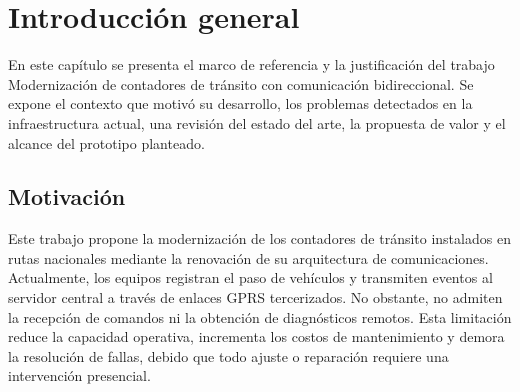 
\chapter{Introducción general} %

\label{Chapter1} %
\label{IntroGeneral}


\newcommand{\keyword}[1]{\textbf{#1}}
\newcommand{\tabhead}[1]{\textbf{#1}}
\newcommand{\code}[1]{\texttt{#1}}
\newcommand{\file}[1]{\texttt{\bfseries#1}}
\newcommand{\option}[1]{\texttt{\itshape#1}}
\newcommand{\grados}{$^{\circ}$}

En este capítulo se presenta el marco de referencia y la justificación del trabajo Modernización de contadores de tránsito con comunicación bidireccional. Se expone el contexto que motivó su desarrollo, los problemas detectados en la infraestructura actual, una revisión del estado del arte, la propuesta de valor y el alcance del prototipo planteado.





\section{Motivación}

Este trabajo propone la modernización de los contadores de tránsito instalados en rutas nacionales mediante la renovación de su arquitectura de comunicaciones. Actualmente, los equipos registran el paso de vehículos y transmiten eventos al servidor central a través de enlaces GPRS tercerizados. No obstante, no admiten la recepción de comandos ni la obtención de diagnósticos remotos. Esta limitación reduce la capacidad operativa, incrementa los costos de mantenimiento y demora la resolución de fallas, debido que todo ajuste o reparación requiere una intervención presencial.

